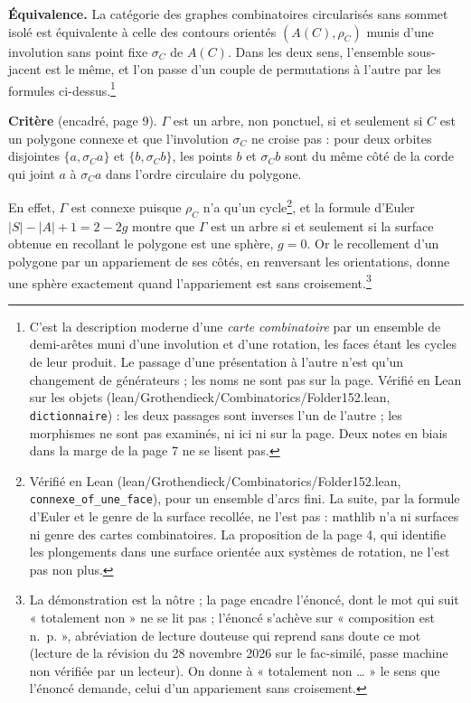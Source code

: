 \documentclass[11pt,a4paper]{article}
\begin{document}
\textbf{Équivalence.} La catégorie des graphes combinatoires circularisés sans
sommet isolé est équivalente à celle des contours orientés $(A(C), \rho_{C})$
munis d'une involution sans point fixe $\sigma_{C}$ de $A(C)$. Dans les deux sens,
l'ensemble sous-jacent est le même, et l'on passe d'un couple de permutations à
l'autre par les formules ci-dessus.\footnote{C'est la description moderne d'une
\emph{carte combinatoire} par un ensemble de demi-arêtes muni d'une involution
et d'une rotation, les faces étant les cycles de leur produit. Le passage d'une
présentation à l'autre n'est qu'un changement de générateurs ; les noms ne sont
pas sur la page. Vérifié en Lean sur les objets
(lean/Grothendieck/Combinatorics/Folder152.lean, \texttt{dictionnaire}) : les deux
passages sont inverses l'un de l'autre ; les morphismes ne sont pas
examinés, ni ici ni sur la page. Deux notes en biais dans la marge de la page 7 ne se lisent
pas.}

\textbf{Critère} (encadré, page 9). $\Gamma$ est un arbre, non ponctuel, si et
seulement si $C$ est un polygone connexe et que l'involution $\sigma_{C}$ ne
croise pas : pour deux orbites disjointes $\{a, \sigma_{C} a\}$ et
$\{b, \sigma_{C} b\}$, les points $b$ et $\sigma_{C}b$ sont du même côté de la
corde qui joint $a$ à $\sigma_{C}a$ dans l'ordre circulaire du polygone.

En effet, $\Gamma$ est connexe puisque $\rho_{C}$ n'a qu'un cycle\footnote{Vérifié
en Lean (lean/Grothendieck/Combinatorics/Folder152.lean, \texttt{connexe\_of\_une\_face}),
pour un ensemble d'arcs fini. La suite, par la formule d'Euler et le genre de
la surface recollée, ne l'est pas : mathlib n'a ni surfaces ni genre des
cartes combinatoires. La proposition de la page 4, qui identifie les
plongements dans une surface orientée aux systèmes de rotation, ne l'est pas
non plus.}, et la formule
d'Euler $|S| - |A| + 1 = 2 - 2g$ montre que $\Gamma$ est un arbre si et seulement
si la surface obtenue en recollant le polygone est une sphère, $g = 0$. Or le
recollement d'un polygone par un appariement de ses côtés, en renversant les
orientations, donne une sphère exactement quand l'appariement est sans
croisement.\footnote{La démonstration est la nôtre ; la page encadre l'énoncé,
dont le mot qui suit « totalement non » ne se lit pas ; l'énoncé s'achève sur
« composition est n.\ p. », abréviation de lecture douteuse qui reprend sans
doute ce mot (lecture de la révision du 28 novembre 2026 sur le fac-similé, passe machine non vérifiée par un lecteur). On
donne à « totalement non … » le sens que l'énoncé demande, celui d'un
appariement sans croisement.}
\end{document}
